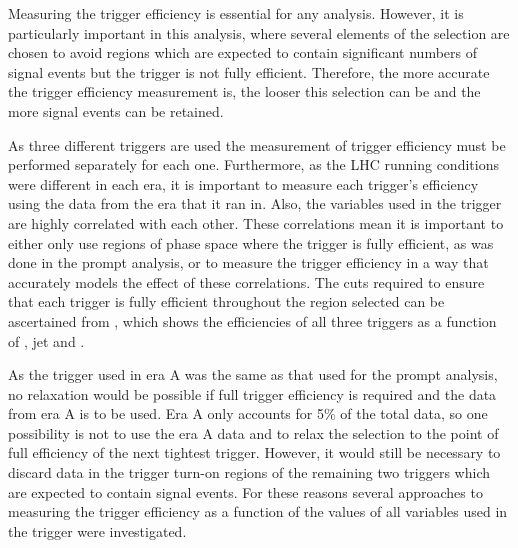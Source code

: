 Measuring the trigger efficiency is essential for any analysis. However, it is particularly important in this analysis, where several elements of the selection are chosen to avoid regions which are expected to contain significant numbers of signal events but the trigger is not fully efficient. Therefore, the more accurate the trigger efficiency measurement is, the looser this selection can be and the more signal events can be retained.

As three different triggers are used the measurement of trigger efficiency must be performed separately for each one. Furthermore, as the LHC running conditions were different in each era, it is important to measure each trigger's efficiency using the data from the era that it ran in. Also, the variables used in the trigger are highly correlated with each other. These correlations mean it is important to either only use regions of phase space where the trigger is fully efficient, as was done in the prompt analysis, or to measure the trigger efficiency in a way that accurately models the effect of these correlations. The cuts required to ensure that each trigger is fully efficient throughout the region selected can be ascertained from , which shows the efficiencies of all three triggers as a function of \METnoMU, jet \pt and \Mjj.

As the trigger used in era A was the same as that used for the prompt analysis, no relaxation would be possible if full trigger efficiency is required and the data from era A is to be used. Era A only accounts for 5\% of the total data, so one possibility is not to use the era A data and to relax the selection to the point of full efficiency of the next tightest trigger. However, it would still be necessary to discard data in the trigger turn-on regions of the remaining two triggers which are expected to contain signal events. For these reasons several approaches to measuring the trigger efficiency as a function of the values of all variables used in the trigger were investigated.

